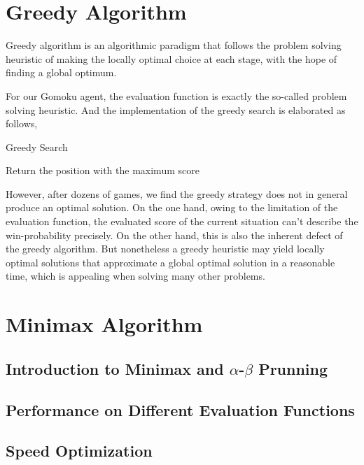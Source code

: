 \documentclass[11pt,a4paper]{article}
\begin{document}
\section{Greedy Algorithm}
Greedy algorithm is an algorithmic paradigm that follows the problem solving heuristic of making the locally optimal choice at each stage, with the hope of finding a global optimum.

For our Gomoku agent, the evaluation function is exactly the so-called problem solving heuristic.
And the implementation of the greedy search is elaborated as follows,
\begin{algorithm}[h]
\caption{Greedy Search}
\LinesNumbered
{}

Return the position with the maximum score
\end{algorithm}

However, after dozens of games, we find the greedy strategy does not in general produce an optimal solution. On the one hand, owing to the limitation of the evaluation function, the evaluated score of the current situation can't describe the win-probability precisely. On the other hand, this is also the inherent defect of the greedy algorithm. But nonetheless a greedy heuristic may yield locally optimal solutions that approximate a global optimal solution in a reasonable time, which is appealing when solving many other problems.

\section{Minimax Algorithm}

\subsection{Introduction to Minimax and $\alpha$-$\beta$ Prunning}

\subsection{Performance on Different Evaluation Functions}

\subsection{Speed Optimization}
\end{document}
